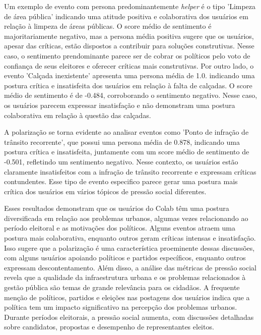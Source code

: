 Um exemplo de evento com persona predominantemente \textit{helper} é o tipo 'Limpeza de área pública' indicando uma atitude positiva e colaborativa dos usuários em relação à limpeza de áreas públicas. O score médio de sentimento é majoritariamente negativo, mas a persona média positiva sugere que os usuários, apesar das críticas, estão dispostos a contribuir para soluções construtivas. Nesse caso, o sentimento prendominante parece ser de cobrar os políticos pelo voto de confiança de seus eleitores e oferecer críticas mais construtivas. Por outro lado, o evento 'Calçada inexistente' apresenta uma persona média de 1.0. indicando uma postura crítica e insatisfeita dos usuários em relação à falta de calçadas. O score médio de sentimento é de -0.484, corroborando o sentimento negativo. Nesse caso, os usuários parecem expressar insatisfação e não demonstram uma postura colaborativa em relação à questão das calçadas.

A polarização se torna evidente ao analisar eventos como 'Ponto de infração de trânsito recorrente', que possui uma persona média de 0.878, indicando uma postura crítica e insatisfeita, juntamente com um score médio de sentimento de -0.501, refletindo um sentimento negativo. Nesse contexto, os usuários estão claramente insatisfeitos com a infração de trânsito recorrente e expressam críticas contundentes. Esse tipo de evento especifico parece gerar uma postura mais crítica dos usuários em vários tópicos de pressão social diferentes.

Esses resultados demonstram que os usuários do Colab têm uma postura diversificada em relação aos problemas urbanos, algumas vezes relacionando ao período eleitoral e as motivações dos políticos. Alguns eventos atraem uma postura mais colaborativa, enquanto outros geram críticas intensas e insatisfação. Isso sugere que a polarização é uma característica proeminente dessas discussões, com alguns usuários apoiando políticos e partidos específicos, enquanto outros expressam descontentamento. Além disso, a análise das métricas de pressão social revela que a qualidade da infraestrutura urbana e os problemas relacionados à gestão pública são temas de grande relevância para os cidadãos. A frequente menção de políticos, partidos e eleições nas postagens dos usuários indica que a política tem um impacto significativo na percepção dos problemas urbanos. Durante períodos eleitorais, a pressão social aumenta, com discussões detalhadas sobre candidatos, propostas e desempenho de representantes eleitos.

